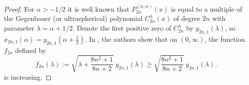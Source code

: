 \documentclass[12pt]{amsart}
\begin{document}
\begin{proof}
	For $\alpha > - 1/2$ it is well known that $P_{2n}^{\left( \alpha ,\alpha \right) }\left(
x\right) $ is equal to a multiple of the Gegenbauer (or ultraspherical)
polynomial $C_{2n}^{\lambda }\left( x\right) $ of degree $2n$ with parameter 
$\lambda =\alpha +1/2.$ Denote the first positive zero of $C_{2n}^{\lambda }$
by $y_{2n,1}\left( \lambda \right) $, so $x_{2n,1}\left( \alpha \right)
=y_{2n,1}\left( \alpha +\frac{1}{2}\right) .$ In \cite[p. 32]{ElSi99}, the authors show
 that on $\left( 0,\infty \right)$, the function $f_{2n}$ defined by 
\begin{equation*}
f_{2n}\left( \lambda \right) :=\sqrt{\lambda +\frac{8n^{2}+1}{8n+2}}
 \ y_{2n,1}\left( \lambda \right)
 \ge
 \sqrt{\frac{8n^{2}+1}{8n+2}}
 \ y_{2n,1}\left( \lambda \right),
\end{equation*}
is increasing. 


\end{proof}
\end{document}
